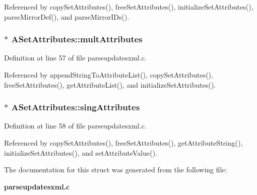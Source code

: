Referenced by copy\-Set\-Attributes(), free\-Set\-Attributes(), initialize\-Set\-Attributes(), parse\-Mirror\-Def(), and parse\-Mirror\-IDs().
\subsubsection{$\ast$ {\bf ASet\-Attributes::mult\-Attributes}}\label{structASetAttributes_o2}




Definition at line 57 of file parseupdatesxml.c.

Referenced by append\-String\-To\-Attribute\-List(), copy\-Set\-Attributes(), free\-Set\-Attributes(), get\-Attribute\-List(), and initialize\-Set\-Attributes().
\subsubsection{$\ast$ {\bf ASet\-Attributes::sing\-Attributes}}\label{structASetAttributes_o3}




Definition at line 58 of file parseupdatesxml.c.

Referenced by copy\-Set\-Attributes(), free\-Set\-Attributes(), get\-Attribute\-String(), initialize\-Set\-Attributes(), and set\-Attribute\-Value().

The documentation for this struct was generated from the following file:\begin{CompactItemize}
\item 
{\bf parseupdatesxml.c}\end{CompactItemize}
